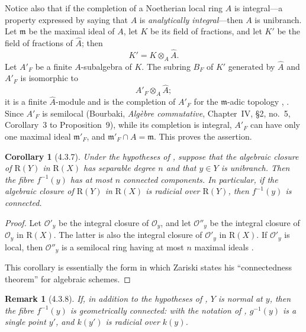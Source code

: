 \documentclass[oneside]{amsart}
\theoremstyle{ega-env-style}
\theoremstyle{ega-thm-env-style}
\newtheorem*{corollary}{Corollary}
\theoremstyle{ega-defn-env-style}
\newtheorem*{remark}{Remark}
\def\mathcal{\mathscr}
\def\sh{\mathcal}                   %
\def\kres{k}                        %
\let\EGAOriginalLabel\label
\renewcommand{\label}[1]{\phantomsection\EGAOriginalLabel{#1}}
\begin{document}
Notice also that if the completion of a Noetherian local ring $A$ is
integral---a property expressed by saying that $A$ is
\emph{analytically integral}---then $A$ is unibranch.  Let
$\mathfrak{m}$ be the maximal ideal of $A$, let $K$ be its field of
fractions, and let $K'$ be the field of fractions of $\widehat{A}$;
then
\[
  K'=K\otimes_A\widehat{A}.
\]
Let $A'_F$ be a finite $A$-subalgebra of $K$.  The subring $B_F$ of
$K'$ generated by $\widehat{A}$ and $A'_F$ is isomorphic to
\[
  A'_F\otimes_A\widehat{A};
\]
it is a finite $\widehat{A}$-module and is the completion of $A'_F$
for the $\mathfrak{m}$-adic topology
, .  Since $A'_F$ is semilocal
(Bourbaki, \emph{Alg\`ebre commutative}, Chapter~IV, \S2, no.~5,
Corollary~3 to Proposition~9), while its completion is integral,
$A'_F$ can have only one maximal ideal $\mathfrak{m}'_F$, and
$\mathfrak{m}'_F\cap A=\mathfrak{m}$.  This proves the assertion.

\begin{corollary}[4.3.7]
\label{III.4.3.7}
Under the hypotheses of , suppose that the algebraic
closure of $\mathrm{R}(Y)$ in $\mathrm{R}(X)$ has separable degree $n$ and that
$y\in Y$ is unibranch.  Then the fibre $f^{-1}(y)$ has at most $n$
connected components.  In particular, if the algebraic closure of
$\mathrm{R}(Y)$ in $\mathrm{R}(X)$ is radicial over $\mathrm{R}(Y)$, then $f^{-1}(y)$ is
connected.
\end{corollary}

\begin{proof}
Let $\sh{O}'_y$ be the integral closure of $\sh{O}_y$, and let
$\sh{O}''_y$ be the integral closure of $\sh{O}_y$ in $\mathrm{R}(X)$.
The latter is also the integral closure of $\sh{O}'_y$ in $\mathrm{R}(X)$.
If $\sh{O}'_y$ is local, then $\sh{O}''_y$ is a semilocal ring
having at most $n$ maximal ideals
\cite[vol.~I, p.~289, Theorem~22]{I-13}.

This corollary is essentially the form in which Zariski states his
``connectedness theorem'' for algebraic schemes.
\end{proof}

\begin{remark}[4.3.8]
\label{III.4.3.8}
If, in addition to the hypotheses of , $Y$ is
normal at $y$, then the fibre $f^{-1}(y)$ is geometrically
connected: with the notation of , $g^{-1}(y)$ is a
single point $y'$, and $\kres(y')$ is radicial over $\kres(y)$.
\end{remark}
\end{document}
